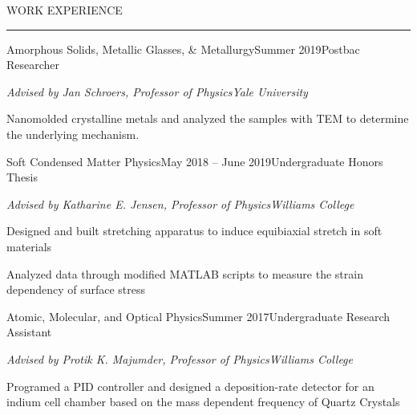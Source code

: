 \documentclass{short_resume} %
\renewenvironment{rSection}[1]{
	\sectionskip
	\textcolor{RoyalPurple}{\MakeUppercase{#1}}
	\sectionlineskip
	\hrule
	\begin{list}{}{
			\setlength{\leftmargin}{1.5em}
		}
		\item[]
	}{
	\end{list}
}
\begin{document}
	
	\vspace{-1em}
	\begin{rSection}{Work Experience}
		\begin{rSubsection}{Amorphous Solids, Metallic Glasses, \& Metallurgy}{Summer 2019}{Postbac Researcher}{}
			\vspace{-.5em}
			\item[] {\em Advised by Jan Schroers, Professor of Physics}\hfill {\em Yale University}
			\item Nanomolded crystalline metals and analyzed the samples with TEM to determine the underlying mechanism.
		\end{rSubsection}
		
		
		\begin{rSubsection}{Soft Condensed Matter Physics}{May 2018 -- June 2019}{Undergraduate Honors Thesis}{}
			\vspace{-.5em}
			\item[] {\em Advised by Katharine E. Jensen, Professor of Physics}\hfill {\em Williams College}
			\item Designed and built stretching apparatus to induce equibiaxial stretch in soft materials 
			\item Analyzed data through modified MATLAB scripts to measure the strain dependency of surface stress 
			
		\end{rSubsection}
		
		
		\begin{rSubsection}{Atomic, Molecular, and Optical Physics}{Summer 2017}{Undergraduate Research Assistant}{}
			\vspace{-.5em}
			\item[] {\em Advised by Protik K. Majumder, Professor of Physics}\hfill {\em Williams College}
			\item Programed a PID controller and designed a deposition-rate detector for an indium cell chamber based on the mass dependent frequency of Quartz Crystals
		\end{rSubsection}
		
	\end{rSection}
	
	
	
\end{document}
